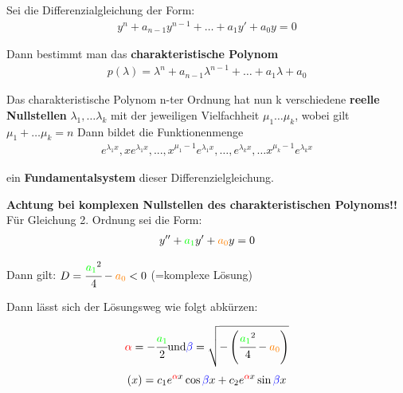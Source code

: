 \documentclass[german]{latex4ei/latex4ei_sheet}
\begin{document}
\begin{sectionbox}
Sei die Differenzialgleichung der Form:
\begin{align*}
    y^{n} + a_{n-1} y^{n-1} + \dots + a_1 y' + a_0 y = 0
\end{align*}  

Dann bestimmt man das \textbf{charakteristische Polynom}
\begin{align*}
    p(\lambda) = \lambda^n + a_{n-1}\lambda^{n-1} + \dots + a_1 \lambda + a_0 
\end{align*} 

Das charakteristische Polynom n-ter Ordnung hat nun k verschiedene \textbf{reelle Nullstellen} $\lambda_1, \dots \lambda_k$ mit der jeweiligen Vielfachheit $\mu_1 \dots \mu_k$, wobei gilt $ \mu_1+ \dots \mu_k = n$
\newline 
Dann bildet die Funktionenmenge 
\begin{align*}
  e^{\lambda_1 x} , xe^{\lambda_1x}, ..., x^{\mu_1-1}e^{\lambda_1x}, \dots , e^{\lambda_k x},\dots x^{\mu_k-1}e^{\lambda_kx}
\end{align*}

ein \textbf{Fundamentalsystem} dieser Differenzielgleichung. 


\textbf{Achtung bei komplexen Nullstellen des charakteristischen Polynoms!!}
Für Gleichung 2. Ordnung sei die Form:
\begin{align*}
    y'' + \textcolor{green}{a_1}y' + \textcolor{orange}{a_0} y = 0   
\end{align*}


Dann gilt: $D = \cfrac{\textcolor{green}{a_1}^2}{4} - \textcolor{orange}{a_0} < 0$                           
(=komplexe Lösung) 

Dann lässt sich der Lösungsweg wie folgt abkürzen:

$$    \textcolor{red}{\alpha} = - \cfrac{\textcolor{green}{a_1}}{2} \text{und} \textcolor{blue}{\beta} = \sqrt{-\left(\cfrac{\textcolor{green}{a_1}^2}{4} - \textcolor{orange}{a_0} \right) } $$ \newline
$$(x) = c_1 e^{\textcolor{red}{\alpha} x} \cos{\textcolor{blue}{\beta} x} + c_2 e^{\textcolor{red}{\alpha} x} \sin{\textcolor{blue}{\beta} x}$$

\end{sectionbox}
\end{document}
